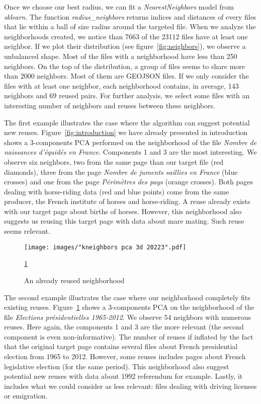 \documentclass[a4paper]{article}
\begin{document}
	Once we choose our best radius, we can fit a \emph{NearestNeighbors} model from \emph{sklearn}. The function \emph{radius\_neighbors} returns indices and distances of every files that lie within a ball of size radius around the targeted file. When we analyze the neighborhoods created, we notice than 7663 of the 23112 files have at least one neighbor. If we plot their distribution (see figure~\ref{fig:neighbors}), we observe a unbalanced shape. Most of the files with a neighborhood have less than 250 neighbors. On the top of the distribution, a group of files seems to share more than 2000 neighbors. Most of them are GEOJSON files. If we only consider the files with at least one neighbor, each neighborhood contains, in average, 143 neighbors and 69 reused pairs. For further analysis, we select some files with an interesting number of neighbors and reuses between these neighbors. 
	
	The first example illustrates the case where the algorithm can suggest potential new reuses. Figure~\ref{fig:introduction} we have already presented in introduction shows a 3-components PCA performed on the neighborhood of the file \emph{Nombre de naissances d'équidés en France}. Components 1 and 3 are the most interesting. We observe six neighbors, two from the same page than our target file (red diamonds), three from the page \emph{Nombre de juments saillies en France} (blue crosses) and one from the page \emph{Périmètres des pays} (orange crosses). Both pages dealing with horse-riding data (red and blue points) come from the same producer, the French institute of horses and horse-riding. A reuse already exists with our target page about births of horses. However, this neighborhood also suggests us reusing this target page with data about mare mating. Such reuse seems relevant. 
	
	\begin{figure}[]
		\texttt{[image: images/"kneighbors pca 3d 20223".pdf]}
		\caption{An already reused neighborhood}
		\label{fig:pca election}
		\ref{fig:pca election}
	\end{figure}
	
	The second example illustrates the case where our neighborhood completely fits existing reuses. Figure~\ref{fig:pca election} shows a 3-components PCA on the neighborhood of the file \emph{Elections présidentielles 1965-2012}. We observe 54 neighbors with numerous reuses. Here again, the components 1 and 3 are the more relevant (the second component is even non-informative). The number of reuses if inflated by the fact that the original target page contains several files about French presidential election from 1965 to 2012. However, some reuses includes pages about French legislative election (for the same period). This neighborhood also suggest potential new reuses with data about 1992 referendum for example. Lastly, it includes what we could consider as less relevant: files dealing with driving licenses or emigration.
\end{document}
